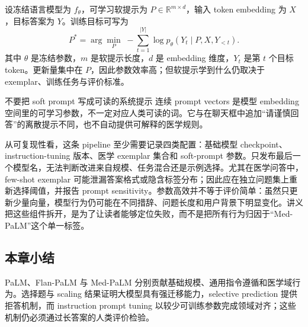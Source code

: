 

设冻结语言模型为 $f_{\theta}$，可学习软提示为 $P\in\mathbb{R}^{m\times d}$，输入 token embedding 为 $X$，目标答案为 $Y$。训练目标可写为
$$
P^{*}=\arg\min_{P}\; -\sum_{t=1}^{|Y|}\log p_{\theta}(Y_t\mid P,X,Y_{<t}).
$$
其中 $\theta$ 是冻结参数，$m$ 是软提示长度，$d$ 是 embedding 维度，$Y_t$ 是第 $t$ 个目标 token。更新量集中在 $P$，因此参数效率高；但软提示学到什么仍取决于 exemplar、训练任务与评价标准。


\begin{warningbox}{不要把 soft prompt 写成可读的系统提示}
连续 prompt vectors 是模型 embedding 空间里的可学习参数，不一定对应人类可读的词。它与在聊天框中追加“请谨慎回答”的离散提示不同，也不自动提供可解释的医学规则。
\end{warningbox}

从可复现性看，这条 pipeline 至少需要记录四类配置：基础模型 checkpoint、instruction-tuning 版本、医学 exemplar 集合和 soft-prompt 参数。只发布最后一个模型名，无法判断改进来自规模、任务混合还是示例选择。尤其在医学问答中，few-shot exemplar 可能泄漏答案格式或隐含标签分布；因此应在独立问题集上重新选择阈值，并报告 prompt sensitivity。参数高效并不等于评价简单：虽然只更新少量向量，模型行为仍可能在不同措辞、问题长度和用户背景下明显变化。讲义把这些组件拆开，是为了让读者能够定位失败，而不是把所有行为归因于“Med-PaLM”这个单一标签。

\subsection{本章小结}

PaLM、Flan-PaLM 与 Med-PaLM 分别贡献基础规模、通用指令遵循和医学域行为。选择题与 scaling 结果证明大模型具有强迁移能力，selective prediction 提供拒答机制，而 instruction prompt tuning 以较少可训练参数完成领域对齐；这些机制仍必须通过长答案的人类评价检验。

